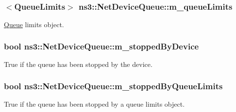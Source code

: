 \subsubsection[{\texorpdfstring{m\+\_\+queue\+Limits}{m_queueLimits}}]{$<${\bf Queue\+Limits}$>$ ns3\+::\+Net\+Device\+Queue\+::m\+\_\+queue\+Limits\hspace{0.3cm}{\ttfamily [private]}}\hypertarget{classns3_1_1NetDeviceQueue_a29a6c2635a83e3ea45365a3a0a839639}{}\label{classns3_1_1NetDeviceQueue_a29a6c2635a83e3ea45365a3a0a839639}


\hyperlink{classns3_1_1Queue}{Queue} limits object. 

\subsubsection[{\texorpdfstring{m\+\_\+stopped\+By\+Device}{m_stoppedByDevice}}]{\setlength{\rightskip}{0pt plus 5cm}bool ns3\+::\+Net\+Device\+Queue\+::m\+\_\+stopped\+By\+Device\hspace{0.3cm}{\ttfamily [private]}}\hypertarget{classns3_1_1NetDeviceQueue_ae0ffd8982c7000674eac6948a398f3de}{}\label{classns3_1_1NetDeviceQueue_ae0ffd8982c7000674eac6948a398f3de}


True if the queue has been stopped by the device. 

\subsubsection[{\texorpdfstring{m\+\_\+stopped\+By\+Queue\+Limits}{m_stoppedByQueueLimits}}]{\setlength{\rightskip}{0pt plus 5cm}bool ns3\+::\+Net\+Device\+Queue\+::m\+\_\+stopped\+By\+Queue\+Limits\hspace{0.3cm}{\ttfamily [private]}}\hypertarget{classns3_1_1NetDeviceQueue_a025451a1ed0b95ba3e10b1597f1b3873}{}\label{classns3_1_1NetDeviceQueue_a025451a1ed0b95ba3e10b1597f1b3873}


True if the queue has been stopped by a queue limits object. 

